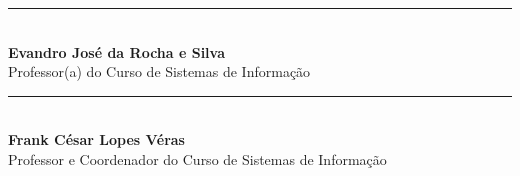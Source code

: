 \documentclass[a4paper, 12pt]{article}
\begin{document}
\vfill
\begin{center}
    \rule{6cm}{0.4pt} \\ 
    \textbf{Evandro José da Rocha e Silva} \\
    Professor(a) do Curso de Sistemas de Informação \\[1.5cm]
    
    \rule{6cm}{0.4pt} \\ 
    \textbf{Frank César Lopes Véras} \\
    Professor e Coordenador do Curso de Sistemas de Informação
\end{center}
    
\end{document}
